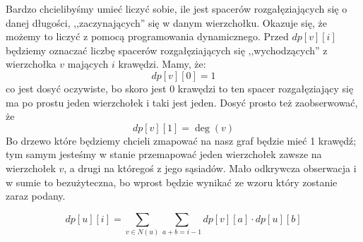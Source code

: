     Bardzo chcielibyśmy umieć liczyć sobie, ile jest spacerów rozgałęziających się o danej długości, ,,zaczynających'' się w danym wierzchołku. Okazuje się, że możemy to liczyć z pomocą programowania dynamicznego. Przed $dp[v][i]$ będziemy oznaczać liczbę spacerów rozgałęziających się ,,wychodzących'' z wierzchołka $v$ mających $i$ krawędzi. Mamy, że:
    \begin{equation*}
        dp[v][0] = 1
    \end{equation*}
    co jest dosyć oczywiste, bo skoro jest 0 krawędzi to ten spacer rozgałęziający się ma po prostu jeden wierzchołek i taki jest jeden.
    Dosyć prosto też zaobserwować, że 
    \begin{equation*}
        dp[v][1] = \deg(v)
    \end{equation*}
    Bo drzewo które będziemy chcieli zmapować na nasz graf będzie mieć 1 krawędź; tym samym jesteśmy w stanie przemapować jeden wierzchołek zawsze na wierzchołek $v$, a drugi na któregoś z jego sąsiadów. Mało odkrywcza obserwacja i w sumie to bezużyteczna, bo wprost będzie wynikać ze wzoru który zostanie zaraz podany.

    \begin{theorem}
        \begin{equation}
            dp[u][i] = \sum_{v \in N(u)} \sum_{a+b=i-1} dp[v][a] \cdot dp[u][b]
        \end{equation}
    \end{theorem}

